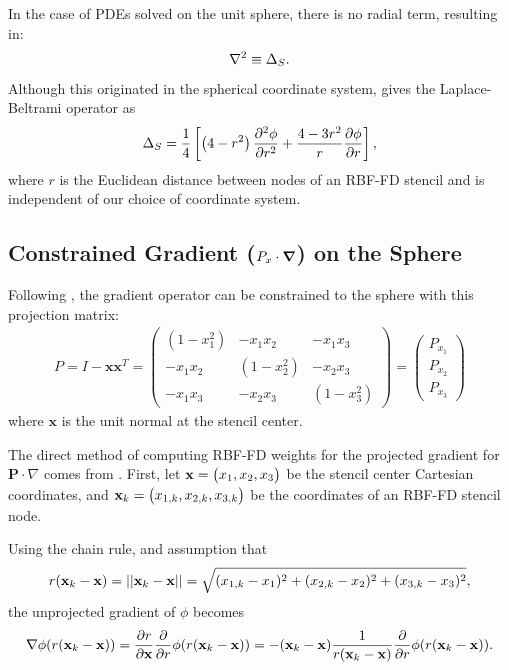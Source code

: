 \documentclass[11pt]{report}
\begin{document}
{In the case of PDEs solved on the unit sphere, there is no radial term, resulting in:
\begin{align}
\nabla^2 \equiv \Delta_S .
\end{align}
Although this originated in the spherical coordinate system, \cite{WrightFlyerYuen10} gives the Laplace-Beltrami operator as
\begin{align*} 
\Delta_S = \frac{1}{4} \left[ \left(4-r^2\right) \frac{\partial^2 \phi}{\partial r^2} + \frac{4-3r^2}{r} \frac{\partial \phi}{\partial r} \right],
\end{align*} 
where $r$ is the Euclidean distance between nodes of an RBF-FD stencil and is independent of our choice of coordinate system. 

\subsection{Constrained Gradient ($P_{x} \cdot \grad$) on the Sphere}
\label{sec:projected_grad}

Following \cite{FlyerWright09, FlyerLehto11}, the gradient operator can be constrained to the sphere with this projection matrix: 
\begin{align}
P = I - \mathbf{x} \mathbf{x}^T =  \begin{pmatrix} 
(1-x_1^2) & -x_1 x_2 & -x_1 x_3 \\
-x_1 x_2 & (1-x_2^2) & -x_2 x_3 \\ 
-x_1 x_3 & -x_2 x_3 & (1-x_3^2) 
\end{pmatrix} = \begin{pmatrix} P_{x_1} \\ P_{x_2} \\ P_{x_3} \end{pmatrix}
\label{eq:project_gradient}
\end{align}
where $\mathbf{x}$ is the unit normal at the stencil center. 


The direct method of computing RBF-FD weights for the projected gradient for $\mathbf{P} \cdot \nabla $ comes from \cite{FlyerWright09}. First, let $\mathbf{x} = \begin{pmatrix} x_1, x_2, x_3 \end{pmatrix} $ be the stencil center Cartesian coordinates, and $\mathbf{x}_k=\begin{pmatrix} x_{1,k}, x_{2,k}, x_{3,k}\end{pmatrix}$ be the coordinates of an RBF-FD stencil node. 

Using the chain rule, and assumption that 
$$r(\mathbf{x}_k-\mathbf{x})=\left|\left|\mathbf{x}_k-\mathbf{x}\right|\right| = \sqrt{(x_{1,k}-x_1)^2 + (x_{2,k}-x_2)^2 + (x_{3,k}-x_3)^2},$$
 the unprojected gradient of $\phi$ becomes
\begin{align*}
\nabla \phi(r(\mathbf{x}_k - \mathbf{x})) = \frac{\partial r}{\partial \mathbf{x}}  \frac{\partial }{\partial r} \phi(r(\mathbf{x}_k - \mathbf{x})) = - (\mathbf{x}_k - \mathbf{x})\frac{1}{r(\mathbf{x}_k - \mathbf{x})} \frac{\partial }{\partial r} \phi(r(\mathbf{x}_k - \mathbf{x})) .
\end{align*} 

}
\end{document}
